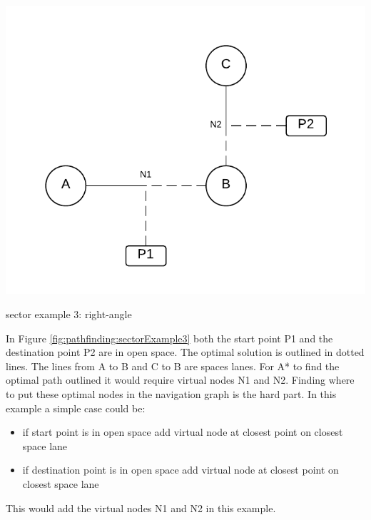 \begin{marginfigure}
	\includegraphics{res/pathfinding/PathFindingSector3.pdf}
    \caption{sector example 3: right-angle}
	\label{fig:pathfinding:sectorExample3}
\end{marginfigure}
In Figure \ref{fig:pathfinding:sectorExample3} both the start point P1 and the destination point P2 are in open space.
The optimal solution is outlined in dotted lines.
The lines from A to B and C to B are spaces lanes.
For A* to find the optimal path outlined it would require virtual nodes N1 and N2.
Finding where to put these optimal nodes in the navigation graph is the hard part.
In this example a simple case could be:
\begin{itemize}
\item if start point is in open space add virtual node at closest point on closest space lane
\item if destination point is in open space add virtual node at closest point on closest space lane
\end{itemize}
This would add the virtual nodes N1 and N2 in this example.

